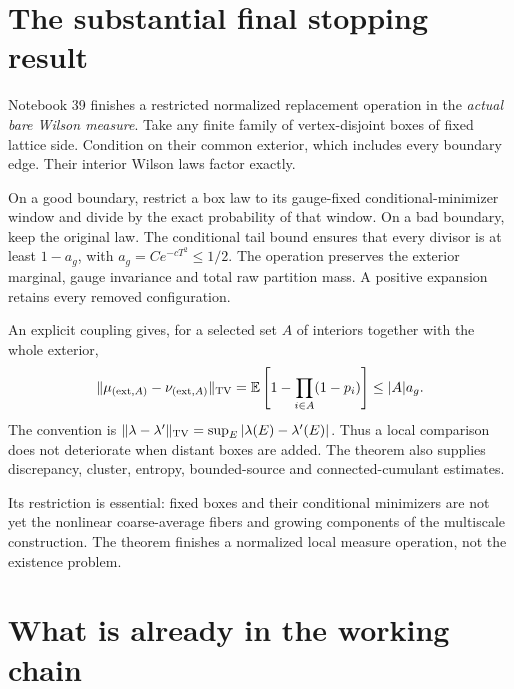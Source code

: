 \section*{The substantial final stopping result}

Notebook 39 finishes a restricted normalized replacement
operation in the \emph{actual bare Wilson measure}.
Take any finite family of vertex-disjoint boxes of
fixed lattice side. Condition on their common exterior,
which includes every boundary edge. Their interior
Wilson laws factor exactly.

On a good boundary, restrict a box law to its
gauge-fixed conditional-minimizer window and divide
by the exact probability of that window. On a bad
boundary, keep the original law. The conditional
tail bound ensures that every divisor is at least
\(1-a_g\), with \(a_g=Ce^{-cT^2}\le1/2\).
The operation preserves the exterior marginal,
gauge invariance and total raw partition mass.
A positive expansion retains every removed
configuration.

An explicit coupling gives, for a selected set
\(A\) of interiors together with the whole exterior,
\[
 \|\mu_{({\rm ext},A)}-\nu_{({\rm ext},A)}\|_{\rm TV}
 =\mathbb E\left[1-\prod_{i\in A}(1-p_i)\right]
 \le |A|a_g.
\]
The convention is \(\|\lambda-\lambda'\|_{\rm TV}
=\sup_E|\lambda(E)-\lambda'(E)|\). Thus a local
comparison does not deteriorate when distant
boxes are added. The theorem also supplies
discrepancy, cluster, entropy, bounded-source
and connected-cumulant estimates.

Its restriction is essential: fixed boxes and
their conditional minimizers are not yet the
nonlinear coarse-average fibers and growing
components of the multiscale construction.
The theorem finishes a normalized local
measure operation, not the existence problem.

\section*{What is already in the working chain}

